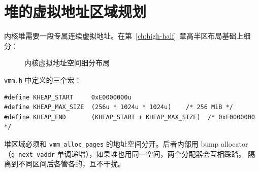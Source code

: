 \section{堆的虚拟地址区域规划}

内核堆需要一段专属连续虚拟地址。在第~\ref{ch:high-half}~章高半区布局基础上细分：

\begin{figure}[H]
  \centering
  
  \caption{内核虚拟地址空间细分布局}
  \label{fig:kernel-vaddr-layout}
\end{figure}

\texttt{vmm.h} 中定义的三个宏：

\begin{lstlisting}[style=cstyle]
#define KHEAP_START     0xE0000000u
#define KHEAP_MAX_SIZE  (256u * 1024u * 1024u)    /* 256 MiB */
#define KHEAP_END       (KHEAP_START + KHEAP_MAX_SIZE)  /* 0xF0000000 */
\end{lstlisting}

\begin{designbox}
堆区域必须和 \texttt{vmm\_alloc\_pages} 的地址空间分开。后者内部用 bump allocator
（\texttt{g\_next\_vaddr} 单调递增），如果堆也用同一空间，两个分配器会互相踩踏。
隔离到不同区间后各管各的，互不干扰。
\end{designbox}


